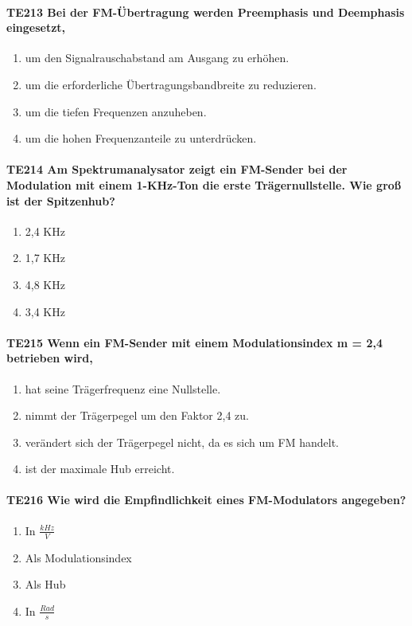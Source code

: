 \documentclass[8pt]{article}
\begin{document}
\begin{enumerate}
\begin{enumerate}[nolistsep,label=\Alph*]
\paragraph*{TE213 Bei der FM-Übertragung werden Preemphasis und Deemphasis eingesetzt,}
\begin{enumerate}[nolistsep,label=\Alph*]
\item um den Signalrauschabstand am Ausgang zu erhöhen.
\item um die erforderliche Übertragungsbandbreite zu reduzieren.
\item um die tiefen Frequenzen anzuheben.
\item um die hohen Frequenzanteile zu unterdrücken.
\end{enumerate}

\paragraph*{TE214 Am Spektrumanalysator zeigt ein FM-Sender bei der Modulation mit einem 1-KHz-Ton die erste Trägernullstelle. Wie groß ist der Spitzenhub?}
\begin{enumerate}[nolistsep,label=\Alph*]
\item 2,4 KHz
\item 1,7 KHz
\item 4,8 KHz
\item 3,4 KHz
\end{enumerate}

\paragraph*{TE215 Wenn ein FM-Sender mit einem Modulationsindex m = 2,4 betrieben wird,}
\begin{enumerate}[nolistsep,label=\Alph*]
\item hat seine Trägerfrequenz eine Nullstelle.
\item nimmt der Trägerpegel um den Faktor 2,4 zu.
\item verändert sich der Trägerpegel nicht, da es sich um FM handelt.
\item ist der maximale Hub erreicht.
\end{enumerate}

\paragraph*{TE216 Wie wird die Empfindlichkeit eines FM-Modulators angegeben?}
\begin{enumerate}[nolistsep,label=\Alph*]
\item In $\frac{kHz}{V}$
\item Als Modulationsindex
\item Als Hub
\item In $\frac{Rad}{s}$
\end{enumerate}


\end{enumerate}
\end{enumerate}
\end{document}
